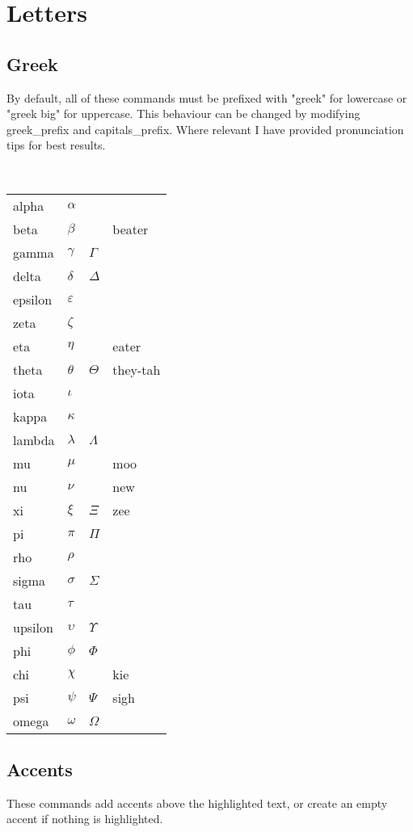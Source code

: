 \documentclass[12pt]{article}
\begin{document}
\section{Letters}
\subsection{Greek}
By default, all of these commands must be prefixed with "greek" for lowercase or "greek big" for uppercase. This behaviour can be changed by modifying greek\_prefix and capitals\_prefix. Where relevant I have provided pronunciation tips for best results.


\

\begin{longtable}{llll}
alpha & $\alpha$ & & \\
beta & $\beta$ &  & beater \\
gamma & $\gamma$ & $\Gamma$ & \\
delta & $\delta$ & $\Delta$ & \\
epsilon & $\varepsilon$ & & \\
zeta & $\zeta$ & & \\
eta & $\eta$ & & eater \\
theta & $\theta$ & $\Theta$ & they-tah \\
iota & $\iota$ & & \\
kappa & $\kappa$ & & \\
lambda & $\lambda$ & $\Lambda$ & \\
mu & $\mu$ & & moo \\
nu & $\nu$ & & new \\
xi & $\xi$ & $\Xi$ & zee \\
pi & $\pi$ & $\Pi$ & \\
rho & $\rho$ & & \\
sigma & $\sigma$ & $\Sigma$ & \\
tau & $\tau$ & & \\
upsilon & $\upsilon$ & $\Upsilon$ & \\
phi & $\phi$ & $\Phi$ & \\
chi & $\chi$ & & kie \\
psi & $\psi$ & $\Psi$ & sigh \\
omega & $\omega$ & $\Omega$ & \\
\end{longtable}


\subsection{Accents}
These commands add accents above the highlighted text, or create an empty accent if nothing is highlighted.
\end{document}

